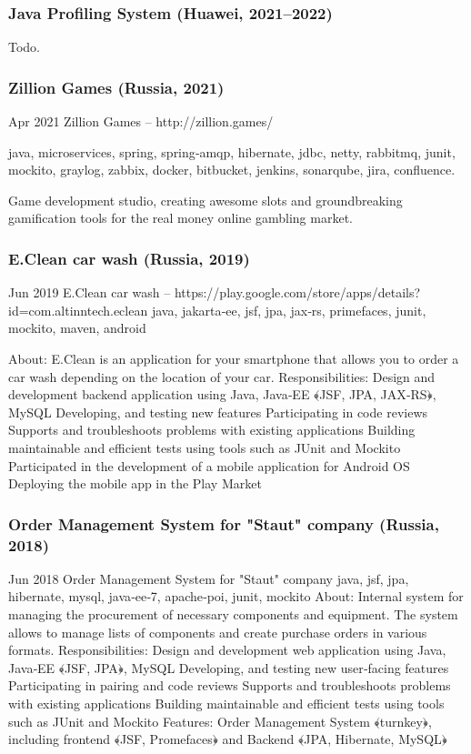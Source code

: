 \documentclass{vl}
\begin{document}
    \subsubsection{Java Profiling System (Huawei, 2021--2022)}

    Todo.

    \subsubsection{Zillion Games (Russia, 2021)}

    Apr 2021 Zillion Games – http://zillion.games/

    java, microservices, spring, spring‐amqp, hibernate, jdbc, netty, rabbitmq, junit, mockito, graylog, zabbix, docker,
    bitbucket, jenkins, sonarqube, jira, confluence.

    Game development studio, creating awesome slots and groundbreaking gamification tools for the real money online
    gambling market.

    \subsubsection{E.Clean car wash (Russia, 2019)}
    Jun 2019 E.Clean car wash – https://play.google.com/store/apps/details?id=com.altinntech.eclean
    java, jakarta‐ee, jsf, jpa, jax‐rs, primefaces, junit, mockito, maven, android

    About: E.Clean is an application for your smartphone that allows you to order a car wash depending on the location of your
    car.
    Responsibilities: Design and development backend application using Java, Java‐EE ﴾JSF, JPA, JAX‐RS﴿, MySQL Developing,
    and testing new features Participating in code reviews Supports and troubleshoots problems with existing applications
    Building maintainable and efficient tests using tools such as JUnit and Mockito Participated in the development of a mobile
    application for Android OS Deploying the mobile app in the Play Market

    \subsubsection{Order Management System for "Staut" company (Russia, 2018)}
    Jun 2018 Order Management System for "Staut" company
    java, jsf, jpa, hibernate, mysql, java‐ee‐7, apache‐poi, junit, mockito
    About: Internal system for managing the procurement of necessary components and equipment. The system allows to
    manage lists of components and create purchase orders in various formats.
    Responsibilities:
    Design and development web application using Java, Java‐EE ﴾JSF, JPA﴿, MySQL
    Developing, and testing new user‐facing features
    Participating in pairing and code reviews
    Supports and troubleshoots problems with existing applications
    Building maintainable and efficient tests using tools such as JUnit and Mockito
    Features:
    Order Management System ﴾turnkey﴿, including frontend ﴾JSF, Promefaces﴿ and Backend ﴾JPA, Hibernate, MySQL﴿
\end{document}
